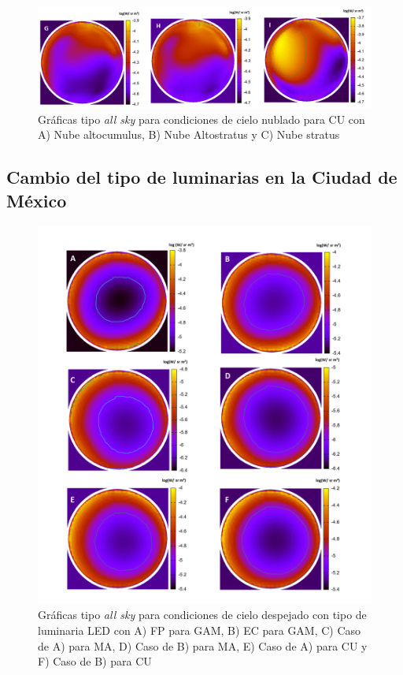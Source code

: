 \begin{figure}[H]
  \centering
    \includegraphics[width=1\textwidth]{7}
  \caption{Gráficas tipo \textit{all sky} para condiciones de cielo nublado para CU con A) Nube altocumulus, B) Nube Altostratus y C) Nube stratus} 
  \label{7}
\end{figure}

\newpage

\subsection{Cambio del tipo de luminarias en la Ciudad de México}

\begin{figure}[H]
  \centering
    \includegraphics[width=1\textwidth]{8}
  \caption{Gráficas tipo \textit{all sky} para condiciones de cielo despejado con tipo de luminaria LED con A) FP para GAM, B) EC para GAM, C) Caso de A) para MA, D) Caso de B) para MA, E) Caso de A) para CU y F) Caso de B) para CU} 
  \label{8}
\end{figure}

